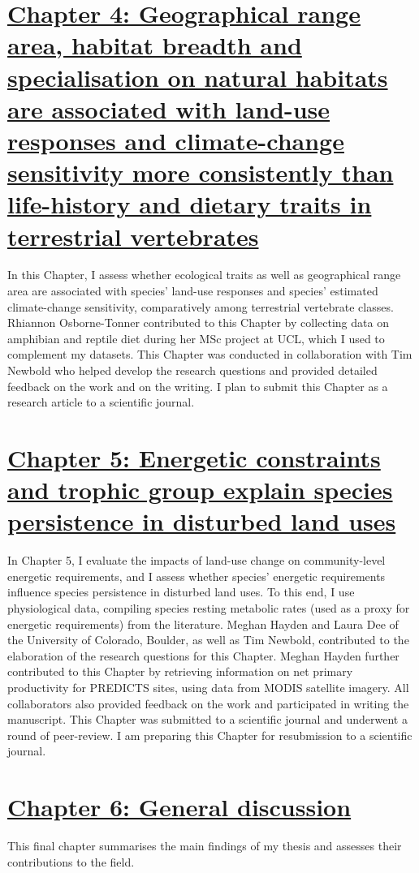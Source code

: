 \section*{\hyperref[sec:4]{Chapter 4: Geographical range area, habitat breadth and specialisation on natural habitats are associated with land-use responses and climate-change sensitivity more consistently than life-history and dietary traits in terrestrial vertebrates}}
In this Chapter, I assess whether ecological traits as well as geographical range area are associated with species' land-use responses and species' estimated climate-change sensitivity, comparatively among terrestrial vertebrate classes. Rhiannon Osborne-Tonner contributed to this Chapter by collecting data on amphibian and reptile diet during her MSc project at UCL, which I used to complement my datasets. This Chapter was conducted in collaboration with Tim Newbold who helped develop the research questions and provided detailed feedback on the work and on the writing.  I plan to submit this Chapter as a research article to a scientific journal.

\section*{\hyperref[sec:5]{Chapter 5: Energetic constraints and trophic group explain species persistence in disturbed land uses}}
In Chapter 5, I evaluate the impacts of land-use change on community-level energetic requirements, and I assess whether species' energetic requirements influence species persistence in disturbed land uses. To this end, I use physiological data, compiling species resting metabolic rates (used as a proxy for energetic requirements) from the literature. Meghan Hayden and Laura Dee of the University of Colorado, Boulder, as well as Tim Newbold, contributed to the elaboration of the research questions for this Chapter. Meghan Hayden further contributed to this Chapter by retrieving information on net primary productivity for PREDICTS sites, using data from MODIS satellite imagery. All collaborators also provided feedback on the work and participated in writing the manuscript. This Chapter was submitted to a scientific journal and underwent a round of peer-review. I am preparing this Chapter for resubmission to a scientific journal.

\section*{\hyperref[sec:6]{Chapter 6: General discussion}}
This final chapter summarises the main findings of my thesis and assesses their contributions to the field.